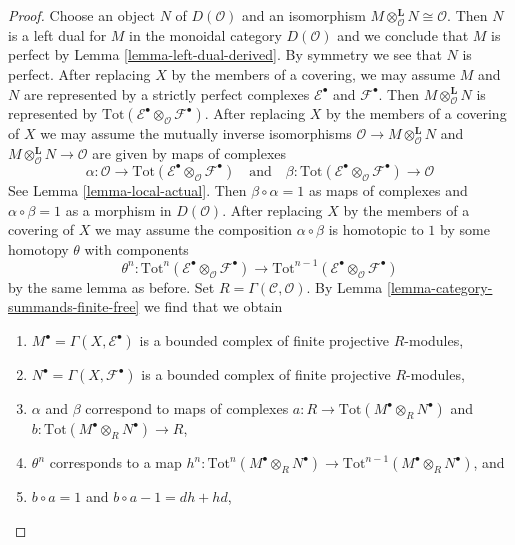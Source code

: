 \begin{proof}
\medskip\noindent
Choose an object $N$ of $D(\mathcal{O})$ and an isomorphism
$M \otimes_\mathcal{O}^\mathbf{L} N \cong \mathcal{O}$.
Then $N$ is a left dual for $M$ in the monoidal category
$D(\mathcal{O})$ and we conclude that $M$ is perfect by
Lemma \ref{lemma-left-dual-derived}. By symmetry we see that
$N$ is perfect. After replacing $X$ by the members of a covering,
we may assume $M$ and $N$ are represented by a strictly perfect
complexes $\mathcal{E}^\bullet$ and $\mathcal{F}^\bullet$.
Then $M \otimes_\mathcal{O}^\mathbf{L} N$ is represented by
$\text{Tot}(\mathcal{E}^\bullet \otimes_\mathcal{O} \mathcal{F}^\bullet)$.
After replacing $X$ by the members of a covering of $X$
we may assume the mutually inverse isomorphisms
$\mathcal{O} \to M \otimes_\mathcal{O}^\mathbf{L} N$ and
$M \otimes_\mathcal{O}^\mathbf{L} N \to \mathcal{O}$
are given by maps of complexes
$$
\alpha : \mathcal{O} \to
\text{Tot}(\mathcal{E}^\bullet \otimes_\mathcal{O} \mathcal{F}^\bullet)
\quad\text{and}\quad
\beta :
\text{Tot}(\mathcal{E}^\bullet \otimes_\mathcal{O} \mathcal{F}^\bullet)
\to \mathcal{O}
$$
See Lemma \ref{lemma-local-actual}. Then $\beta \circ \alpha = 1$
as maps of complexes and $\alpha \circ \beta = 1$ as a morphism
in $D(\mathcal{O})$. After replacing $X$ by the members of a covering
of $X$ we may assume the composition $\alpha \circ \beta$ is homotopic to $1$
by some homotopy $\theta$ with components
$$
\theta^n :
\text{Tot}^n(\mathcal{E}^\bullet \otimes_\mathcal{O} \mathcal{F}^\bullet)
\to
\text{Tot}^{n - 1}(
\mathcal{E}^\bullet \otimes_\mathcal{O} \mathcal{F}^\bullet)
$$
by the same lemma as before. Set $R = \Gamma(\mathcal{C}, \mathcal{O})$. By
Lemma \ref{lemma-category-summands-finite-free}
we find that we obtain
\begin{enumerate}
\item $M^\bullet = \Gamma(X, \mathcal{E}^\bullet)$
is a bounded complex of finite projective $R$-modules,
\item $N^\bullet = \Gamma(X, \mathcal{F}^\bullet)$
is a bounded complex of finite projective $R$-modules,
\item $\alpha$ and $\beta$ correspond to maps of complexes
$a : R \to \text{Tot}(M^\bullet \otimes_R N^\bullet)$ and
$b : \text{Tot}(M^\bullet \otimes_R N^\bullet) \to R$,
\item $\theta^n$ corresponds to a map
$h^n : \text{Tot}^n(M^\bullet \otimes_R N^\bullet) \to
\text{Tot}^{n - 1}(M^\bullet \otimes_R N^\bullet)$, and
\item $b \circ a = 1$ and $b \circ a - 1 = dh + hd$,
\end{enumerate}

\end{proof}
